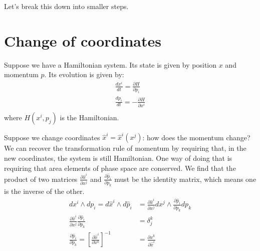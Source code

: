 \documentclass[aps,pra,10pt,floatfix,nofootinbib]{revtex4-1}
\theoremstyle{definition}
\begin{document}
Let's break this down into smaller steps.

\section{Change of coordinates}

Suppose we have a Hamiltonian system. Its state is given by position $x$ and momentum $p$. Its evolution is given by:
\begin{equation}
\begin{aligned}
\frac{dx^i}{dt} = \frac{\partial H}{\partial p_i}  \\
\frac{dp_i}{dt} = - \frac{\partial H}{\partial x^i}  \\
\end{aligned}
\label{Hamilton}
\end{equation}
where $H(x^i,p_j)$ is the Hamiltonian.

Suppose we change coordinates $\hat{x}^i = \hat{x}^i(x^j)$: how does the momentum change? We can recover the transformation rule of momentum by requiring that, in the new coordinates, the system is still Hamiltonian. One way of doing that is requiring that area elements of phase space are conserved. We find that the product of two matrices $\frac{\partial \hat{x}^i}{\partial x^j}$ and $\frac{\partial \hat{p}_i}{\partial p_k}$ must be the identity matrix, which means one is the inverse of the other.
\begin{equation*}
\begin{aligned}
dx^i \wedge dp_i = d\hat{x}^i\wedge d\hat{p}_i &=  \frac{\partial \hat{x}^i}{\partial x^j} dx^j \wedge \frac{\partial \hat{p}_i}{\partial p_k} dp_k \\
\frac{\partial \hat{x}^i}{\partial x^j} \frac{\partial \hat{p}_i}{\partial p_k} &= \delta^k_j \\
\frac{\partial \hat{p}_i}{\partial p_k} = \left[\frac{\partial \hat{x}^i}{\partial x^k}\right]^{-1} &=  \frac{\partial x^k}{\partial \hat{x}^i}
\end{aligned}
\end{equation*}
\end{document}

